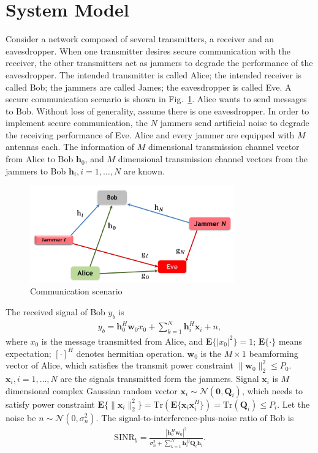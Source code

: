 \documentclass[conference]{IEEEtran}
\begin{document}
\section{System Model} \label{sec:system model}
Consider a network composed of several transmitters, a receiver and an eavesdropper. When one transmitter desires secure communication with the receiver, the other transmitters act as jammers to degrade the performance of the eavesdropper. The intended transmitter is called Alice; the intended receiver is called Bob; the jammers are called James; the eavesdropper is called Eve. A secure communication scenario is shown in Fig.~\ref{fig:system}. Alice wants to send messages to Bob. Without loss of generality, assume there is one eavesdropper. In order to implement secure communication, the $N$ jammers send artificial noise to degrade the receiving performance of Eve.  Alice and every jammer are equipped with $M$ antennas each. The information of $M$ dimensional transmission channel vector from Alice to Bob $\mathbf{h}_0$, and $M$ dimensional transmission channel vectors from the jammers to Bob $\mathbf{h}_i, i = 1,\ldots,N$ are known.
\begin{figure}[!htbp]
	\centering
	\includegraphics[width=8.8cm]{system1.png} %
	\caption{Communication scenario}
	\label{fig:system}
\end{figure}
The received signal of Bob $y_b$ is
\begin{eqnarray}
y_b =\mathbf{h}_0^{H}\mathbf{w}_0x_0 + \sum_{k=1}^N \mathbf{h}_{i}^H\mathbf{x}_{i} + n,
\end{eqnarray}
where $x_0$ is the message transmitted from Alice, and $\mathbf{E}\{|x_0|^2\} = 1$; $\mathbf{E}\{\cdot\}$ means expectation; $[\cdot]^H$ denotes hermitian operation. $\mathbf{w}_{0}$  is the $M \times 1$ beamforming vector of Alice, which satisfies the transmit power constraint $\|\mathbf{w}_0\|_2^2 \leq P_0$. $\mathbf{x}_i, i = 1,\ldots,N $ are the signals transmitted form the jammers. Signal $\mathbf{x}_i$ is $M$ dimensional  complex Gaussian random vector $\mathbf{x}_i \sim \mathcal{N}(\mathbf{0}, \mathbf{Q}_i)$, which needs to satisfy power constraint $\mathbf{E}\{\|\mathbf{x}_i\|_2^2\}  = \mathrm{Tr}(\mathbf{E}\{\mathbf{x}_i\mathbf{x}_i^H\} )= \mathrm{Tr}(\mathbf{Q}_i) \leq P_i$. Let the noise be $n \sim \mathcal{N}(0,\sigma_n^2)$. The signal-to-interference-plus-noise ratio of Bob is
\begin{eqnarray}
\mathrm{SINR}_b = \frac{\left| \mathbf{h}_{0}^H\mathbf{w}_{0}\right|^2}{\sigma_n^2 + \sum_{k=1}^{N}\mathbf{h}_{i}^H\mathbf{Q}_{i}\mathbf{h}_i}.
\end{eqnarray}
\end{document}
